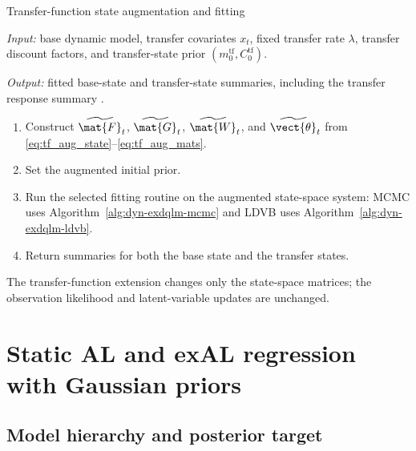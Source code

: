 \begin{suppalgorithm}{Transfer-function state augmentation and fitting}
\label{alg:transfer-fitting}
\par\noindent\emph{Input:} base dynamic model, transfer covariates $x_t$,
fixed transfer rate $\lambda$, transfer discount factors, and transfer-state
prior $(m_0^{\mathrm{tf}},C_0^{\mathrm{tf}})$.
\par\noindent\emph{Output:} fitted base-state and transfer-state summaries,
including the transfer response summary .
\begin{enumerate}[label=(\arabic*)]
\item Construct $\widetilde{\mat{F}}_t$, $\widetilde{\mat{G}}_t$,
$\widetilde{\mat{W}}_t$, and $\widetilde{\vect{\theta}}_t$ from
\eqref{eq:tf_aug_state}--\eqref{eq:tf_aug_mats}.
\item Set the augmented initial prior.
\item Run the selected fitting routine on the augmented state-space system:
MCMC uses Algorithm~\ref{alg:dyn-exdqlm-mcmc} and LDVB uses
Algorithm~\ref{alg:dyn-exdqlm-ldvb}.
\item Return summaries for both the base state and the transfer states.
\end{enumerate}
\end{suppalgorithm}
The transfer-function extension changes only the state-space matrices; the
observation likelihood and latent-variable updates are unchanged.

\section{Static AL and exAL regression with Gaussian priors}
\label{sec:static_ridge}

\subsection{Model hierarchy and posterior target}

